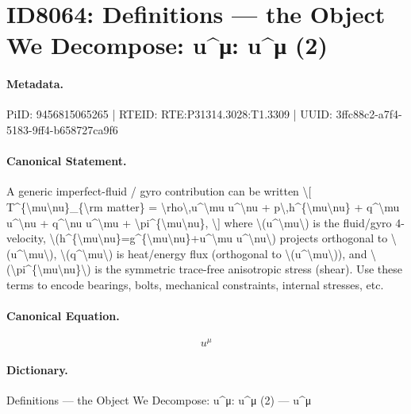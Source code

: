\section*{ID8064: Definitions — the Object We Decompose: u\textasciicircum{}μ: u\textasciicircum{}μ (2)}
\paragraph{Metadata.}
PiID: 9456815065265 | RTEID: RTE:P31314.3028:T1.3309 | UUID: 3ffc88c2-a7f4-5183-9ff4-b658727ca9f6

\paragraph{Canonical Statement.}
A generic imperfect-fluid / gyro contribution can be written \textbackslash{}[ T\textasciicircum{}\{\textbackslash{}mu\textbackslash{}nu\}\_\{\textbackslash{}rm matter\} = \textbackslash{}rho\textbackslash{},u\textasciicircum{}\textbackslash{}mu u\textasciicircum{}\textbackslash{}nu + p\textbackslash{},h\textasciicircum{}\{\textbackslash{}mu\textbackslash{}nu\} + q\textasciicircum{}\textbackslash{}mu u\textasciicircum{}\textbackslash{}nu + q\textasciicircum{}\textbackslash{}nu u\textasciicircum{}\textbackslash{}mu + \textbackslash{}pi\textasciicircum{}\{\textbackslash{}mu\textbackslash{}nu\}, \textbackslash{}] where \textbackslash{}(u\textasciicircum{}\textbackslash{}mu\textbackslash{}) is the fluid/gyro 4-velocity, \textbackslash{}(h\textasciicircum{}\{\textbackslash{}mu\textbackslash{}nu\}=g\textasciicircum{}\{\textbackslash{}mu\textbackslash{}nu\}+u\textasciicircum{}\textbackslash{}mu u\textasciicircum{}\textbackslash{}nu\textbackslash{}) projects orthogonal to \textbackslash{}(u\textasciicircum{}\textbackslash{}mu\textbackslash{}), \textbackslash{}(q\textasciicircum{}\textbackslash{}mu\textbackslash{}) is heat/energy flux (orthogonal to \textbackslash{}(u\textasciicircum{}\textbackslash{}mu\textbackslash{})), and \textbackslash{}(\textbackslash{}pi\textasciicircum{}\{\textbackslash{}mu\textbackslash{}nu\}\textbackslash{}) is the symmetric trace-free anisotropic stress (shear). Use these terms to encode bearings, bolts, mechanical constraints, internal stresses, etc.

\paragraph{Canonical Equation.}
\[
u^\mu
\]

\paragraph{Dictionary.}
Definitions — the Object We Decompose: u\textasciicircum{}μ: u\textasciicircum{}μ (2) — u\textasciicircum{}μ

